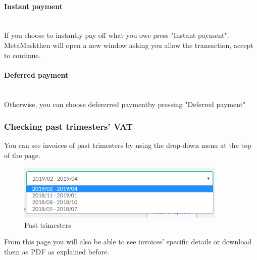 			\paragraph{Instant payment} \mbox{}\\
			If you choose to instantly pay off what you owe press "Instant 
			payment". MetaMask\glosp then will open a new window asking you allow the 
			transaction, accept to continue.
			\paragraph{Deferred payment} \mbox{}\\
			Otherwise, you can choose defererred payment\glosp by pressing "Deferred payment" 
%
		\subsubsection{Checking past trimesters' VAT}
		You can see invoices of past trimesters by using the drop-down 
		menu at the top of the page.
		\begin{figure}[H]
			\includegraphics[width=10cm]{res/images/past_trimesters.png}
			\centering
			\caption{Past trimesters}
		\end{figure}
		\noindent From this page you will also be able to see invoices' specific 
		details or download them as PDF as explained before.